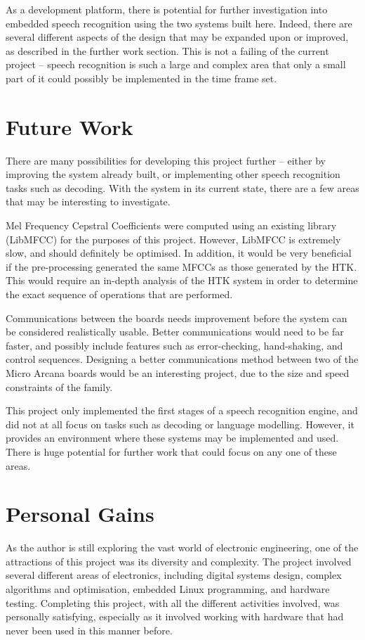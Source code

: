 	As a development platform, there is potential for further investigation into embedded speech recognition using the two systems built here.  Indeed, there are several different aspects of the design that may be expanded upon or improved, as described in the further work section.  This is not a failing of the current project -- speech recognition is such a large and complex area that only a small part of it could possibly be implemented in the time frame set.


\section{Future Work} %
\label{sec:future_work}
	There are many possibilities for developing this project further -- either by improving the system already built, or implementing other speech recognition tasks such as decoding.  With the system in its current state, there are a few areas that may be interesting to investigate.

	Mel Frequency Cepstral Coefficients were computed using an existing library (LibMFCC) for the purposes of this project.  However, LibMFCC is extremely slow, and should definitely be optimised.  In addition, it would be very beneficial if the pre-processing generated the same MFCCs as those generated by the HTK.  This would require an in-depth analysis of the HTK system in order to determine the exact sequence of operations that are performed.

	Communications between the boards needs improvement before the system can be considered realistically usable.  Better communications would need to be far faster, and possibly include features such as error-checking, hand-shaking, and control sequences.  Designing a better communications method between two of the Micro Arcana boards would be an interesting project, due to the size and speed constraints of the family.

	This project only implemented the first stages of a speech recognition engine, and did not at all focus on tasks such as decoding or language modelling.  However, it provides an environment where these systems may be implemented and used.  There is huge potential for further work that could focus on any one of these areas.


\section{Personal Gains} %
\label{sec:personal_gains}
	As the author is still exploring the vast world of electronic engineering, one of the attractions of this project was its diversity and complexity.  The project involved several different areas of electronics, including digital systems design, complex algorithms and optimisation, embedded Linux programming, and hardware testing.  Completing this project, with all the different activities involved, was personally satisfying, especially as it involved working with hardware that had never been used in this manner before.

